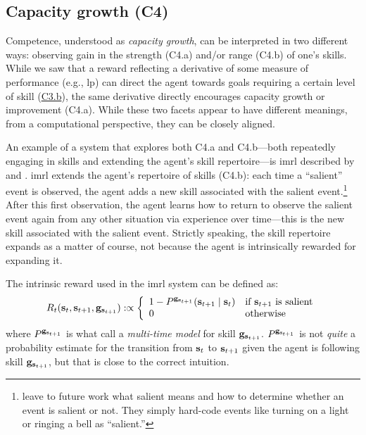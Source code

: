 \documentclass[10pt,letterpaper]{article}
\begin{document}
\subsection{Capacity growth (C4)}
\label{sec:capacitygrowth}

Competence, understood as \emph{capacity growth}, can be interpreted in two different ways: observing gain in the strength (C4.a) and/or range (C4.b) of one’s skills. While we saw that a reward reflecting a derivative of some measure of performance (e.g., \gls{lp}) can direct the agent towards goals requiring a certain level of skill (\hyperref[sec:c3b]{C3.b}), the same derivative directly encourages capacity growth or improvement (C4.a). While these two facets appear to have different meanings, from a computational perspective, they can be closely aligned.


An example of a system that explores both C4.a and C4.b---both repeatedly engaging in skills and extending the agent's skill repertoire---is \gls{imrl} described by \citet{barto2004intrinsically} and \citet{singh2004intrinsically}. \Gls{imrl} extends the agent's repertoire of skills (C4.b): each time a ``salient'' event is observed, the agent adds a new skill associated with the salient event.\footnote{\citet{barto2004intrinsically} leave to future work what salient means and how to determine whether an event is salient or not. They simply hard-code events like turning on a light or ringing a bell as ``salient.''} After this first observation, the agent learns how to return to observe the salient event again from any other situation via experience over time---this is the new skill associated with the salient event. Strictly speaking, the skill repertoire expands as a matter of course, not because the agent is intrinsically rewarded for expanding it.

The intrinsic reward used in the \gls{imrl} system \citep[p.~4]{singh2004intrinsically} can be defined as:
\begin{align}
    R_t({\mathbf{s}}_t,{\mathbf{s}}_{t+1},{\mathbf{g}}_{{\mathbf{s}}_{t+1}}) :\propto \left\{ \begin{array}{ll}
        1 - P^{{\mathbf{g}}_{{\mathbf{s}}_{t+1}}}({\mathbf{s}}_{t+1} \mid {\mathbf{s}}_t ) & \text{if }{\mathbf{s}}_{t+1}\text{ is salient}\\
        0 & \text{otherwise}
        \end{array}\right.
\end{align}
where $P^{{\mathbf{g}}_{{\mathbf{s}}_{t+1}}}$ is what \citet{precup1997multi} call a \emph{multi-time model} for skill ${\mathbf{g}}_{{\mathbf{s}}_{t+1}}$. $P^{{\mathbf{g}}_{{\mathbf{s}}_{t+1}}}$ is not \textit{quite} a probability estimate for the transition from ${\mathbf{s}}_t$ to ${\mathbf{s}}_{t+1}$ given the agent is following skill ${\mathbf{g}}_{{\mathbf{s}}_{t+1}}$, but that is close to the correct intuition. %
\end{document}
